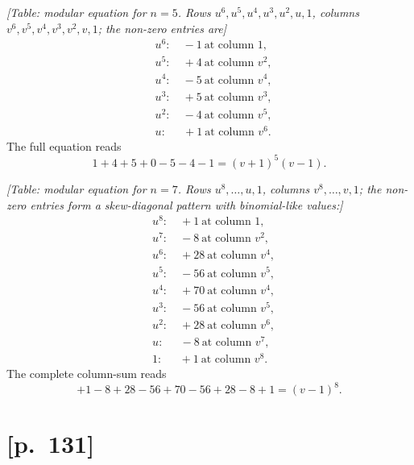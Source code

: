 \documentclass[11pt]{article}
\begin{document}
\medskip
\textit{[Table: modular equation for $n=5$. Rows $u^6, u^5, u^4, u^3, u^2, u, 1$,
columns $v^6, v^5, v^4, v^3, v^2, v, 1$; the non-zero entries are]}
\[
\begin{aligned}
&u^6: \quad -1 \ \text{at column }1, \\
&u^5: \quad +4 \ \text{at column }v^2, \\
&u^4: \quad -5 \ \text{at column }v^4, \\
&u^3: \quad +5 \ \text{at column }v^3, \\
&u^2: \quad -4 \ \text{at column }v^5, \\
&u: \ \ \quad +1 \ \text{at column }v^6.
\end{aligned}
\]
The full equation reads
\[
1 + 4 + 5 + 0 - 5 - 4 - 1 = (v+1)^5 (v-1).
\]

\medskip
\textit{[Table: modular equation for $n=7$. Rows $u^8,\ldots,u,1$, columns
$v^8,\ldots,v,1$; the non-zero entries form a skew-diagonal pattern with
binomial-like values:]}
\[
\begin{aligned}
&u^8: \quad +1 \ \text{at column }1, \\
&u^7: \quad -8 \ \text{at column }v^2, \\
&u^6: \quad +28 \ \text{at column }v^4, \\
&u^5: \quad -56 \ \text{at column }v^5, \\
&u^4: \quad +70 \ \text{at column }v^4, \\
&u^3: \quad -56 \ \text{at column }v^5, \\
&u^2: \quad +28 \ \text{at column }v^6, \\
&u: \ \ \quad -8 \ \text{at column }v^7, \\
&1: \ \ \quad +1 \ \text{at column }v^8.
\end{aligned}
\]
The complete column-sum reads
\[
+1 - 8 + 28 - 56 + 70 - 56 + 28 - 8 + 1 = (v-1)^8.
\]

\section*{[p.~131]}
\end{document}
